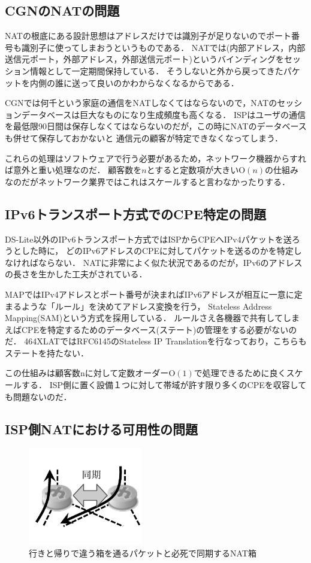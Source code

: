 \subsection{CGNのNATの問題}

NATの根底にある設計思想はアドレスだけでは識別子が足りないのでポート番号も識別子に使ってしまおうというものである．
NATでは(内部アドレス，内部送信元ポート，外部アドレス，外部送信元ポート)というバインディングをセッション情報として一定期間保持している．
そうしないと外から戻ってきたパケットを内側の誰に送って良いのかわからなくなるからである．

CGNでは何千という家庭の通信をNATしなくてはならないので，NATのセッションデータベースは巨大なものになり生成頻度も高くなる．
ISPはユーザの通信を最低限90日間は保存しなくてはならないのだが，この時にNATのデータベースも併せて保存しておかないと
通信元の顧客が特定できなくなってしまう．

これらの処理はソフトウェアで行う必要があるため，ネットワーク機器からすれば意外と重い処理なのだ．
顧客数を$n$とすると定数項が大きい$\mathrm{O}(n)$の仕組みなのだがネットワーク業界ではこれはスケールすると言わなかったりする．

\subsection{IPv6トランスポート方式でのCPE特定の問題}

DS-Lite以外のIPv6トランスポート方式ではISPからCPEへIPv4パケットを送ろうとした時に，
どのIPv6アドレスのCPEに対してパケットを送るのかを特定しなければならない．
NATに非常によく似た状況であるのだが，IPv6のアドレスの長さを生かした工夫がされている．

MAPではIPv4アドレスとポート番号が決まればIPv6アドレスが相互に一意に定まるような「ルール」を決めてアドレス変換を行う，
Stateless Address Mapping(SAM)という方式を採用している．
ルールさえ各機器で共有してしまえばCPEを特定するためのデータベース(ステート)の管理をする必要がないのだ．
464XLATではRFC6145のStateless IP Translationを行なっており，こちらもステートを持たない．

この仕組みは顧客数nに対して定数オーダー$\mathrm{O}(1)$で処理できるために良くスケールする．
ISP側に置く設備１つに対して帯域が許す限り多くのCPEを収容しても問題ないのだ．

\subsection{ISP側NATにおける可用性の問題}

\begin{figure}
\centering
\includegraphics[bb=0 10 140 109,width=5cm]{./yuyarin/cgn-nat.pdf}
\caption{行きと帰りで違う箱を通るパケットと必死で同期するNAT箱}
\end{figure}

